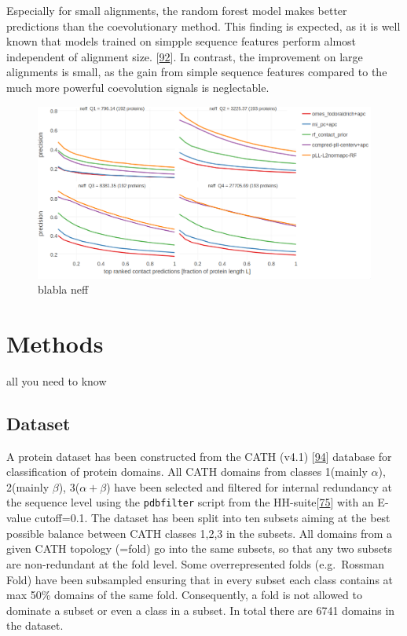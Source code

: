 \documentclass[12pt,a4paper,twoside]{book}
\theoremstyle{definition}
\theoremstyle{definition}
\theoremstyle{remark}
\begin{document}
Especially for small alignments, the random forest model makes better
predictions than the coevolutionary method. This finding is expected, as
it is well known that models trained on simpple sequence features
perform almost independent of alignment size.
{[}\protect\hyperlink{ref-Stahl2017}{92}{]}. In contrast, the
improvement on large alignments is small, as the gain from simple
sequence features compared to the much more powerful coevolution signals
is neglectable.



\begin{figure}
\includegraphics[width=1\linewidth]{img/random_forest_contact_prior/precision_vs_rank_facetted_by_neff_notitle} \caption{blabla neff}\label{fig:performance-neff-rf-with-pll-score}
\end{figure}

\chapter{Methods}\label{methods}

all you need to know

\section{Dataset}\label{dataset}

A protein dataset has been constructed from the CATH (v4.1)
{[}\protect\hyperlink{ref-Sillitoe2015}{94}{]} database for
classification of protein domains. All CATH domains from classes
1(mainly \(\alpha\)), 2(mainly \(\beta\)), 3(\(\alpha+\beta\)) have been
selected and filtered for internal redundancy at the sequence level
using the \texttt{pdbfilter} script from the
HH-suite{[}\protect\hyperlink{ref-Remmert2012}{75}{]} with an E-value
cutoff=0.1. The dataset has been split into ten subsets aiming at the
best possible balance between CATH classes 1,2,3 in the subsets. All
domains from a given CATH topology (=fold) go into the same subsets, so
that any two subsets are non-redundant at the fold level. Some
overrepresented folds (e.g.~Rossman Fold) have been subsampled ensuring
that in every subset each class contains at max 50\% domains of the same
fold. Consequently, a fold is not allowed to dominate a subset or even a
class in a subset. In total there are 6741 domains in the dataset.
\end{document}
